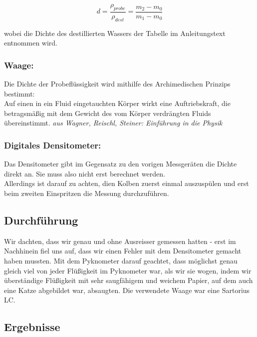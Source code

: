 \documentclass{article}
\begin{document}
\begin{equation}
d=\frac{\rho_{probe}}{\rho_{dest}}=\frac{m_2 - m_0}{m_1 - m_0}
\end{equation}

wobei die Dichte des destillierten Wassers der Tabelle im Anleitungstext entnommen wird. 

\subsubsection*{Waage:}
Die Dichte der Probeflüssigkeit wird mithilfe des Archimedischen Prinzips bestimmt: \\
Auf einen in ein Fluid eingetauchten Körper wirkt eine Auftriebskraft, die betragsmäßig mit dem Gewicht des vom Körper verdrängten Fluids übereinstimmt. \textit{aus Wagner, Reischl, Steiner: Einführung in die Physik}

\subsubsection*{Digitales Densitometer:}
Das Densitometer gibt im Gegensatz zu den vorigen Messgeräten die Dichte direkt an. Sie muss also nicht erst berechnet werden.\\
Allerdings ist darauf zu achten, dien Kolben zuerst einmal auszuspülen und erst beim zweiten Einspritzen die Messung durchzuführen.

\subsection{Durchführung}
Wir dachten, dass wir genau und ohne Ausreisser gemessen hatten - erst im Nachhinein fiel uns auf, dass wir einen Fehler mit dem Densitometer gemacht haben mussten. Mit dem Pyknometer darauf geachtet, dass möglichst genau gleich viel von jeder Flüßigkeit im Pyknometer war, als wir sie wogen, indem wir überständige Flüßigkeit mit sehr saugfähigem und weichem Papier, auf dem auch eine Katze abgebildet war, absaugten. Die verwendete Waage war eine Sartorius LC.
\subsection{Ergebnisse}
\end{document}
